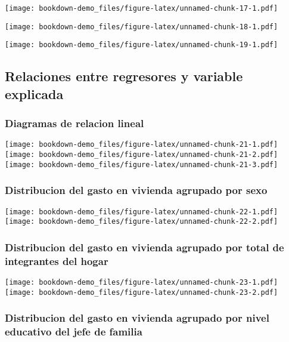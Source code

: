 \documentclass[]{book}
\begin{document}
\texttt{[image: bookdown-demo\_files/figure-latex/unnamed-chunk-17-1.pdf]}

\texttt{[image: bookdown-demo\_files/figure-latex/unnamed-chunk-18-1.pdf]}

\texttt{[image: bookdown-demo\_files/figure-latex/unnamed-chunk-19-1.pdf]}

\subsection{Relaciones entre regresores y variable
explicada}\label{relaciones-entre-regresores-y-variable-explicada}

\subsubsection{Diagramas de relacion
lineal}\label{diagramas-de-relacion-lineal}

\texttt{[image: bookdown-demo\_files/figure-latex/unnamed-chunk-21-1.pdf]}
\texttt{[image: bookdown-demo\_files/figure-latex/unnamed-chunk-21-2.pdf]}
\texttt{[image: bookdown-demo\_files/figure-latex/unnamed-chunk-21-3.pdf]}

\subsubsection{Distribucion del gasto en vivienda agrupado por
sexo}\label{distribucion-del-gasto-en-vivienda-agrupado-por-sexo}

\texttt{[image: bookdown-demo\_files/figure-latex/unnamed-chunk-22-1.pdf]}
\texttt{[image: bookdown-demo\_files/figure-latex/unnamed-chunk-22-2.pdf]}

\subsubsection{Distribucion del gasto en vivienda agrupado por total de
integrantes del
hogar}\label{distribucion-del-gasto-en-vivienda-agrupado-por-total-de-integrantes-del-hogar}

\texttt{[image: bookdown-demo\_files/figure-latex/unnamed-chunk-23-1.pdf]}
\texttt{[image: bookdown-demo\_files/figure-latex/unnamed-chunk-23-2.pdf]}

\subsubsection{Distribucion del gasto en vivienda agrupado por nivel
educativo del jefe de
familia}\label{distribucion-del-gasto-en-vivienda-agrupado-por-nivel-educativo-del-jefe-de-familia}
\end{document}
